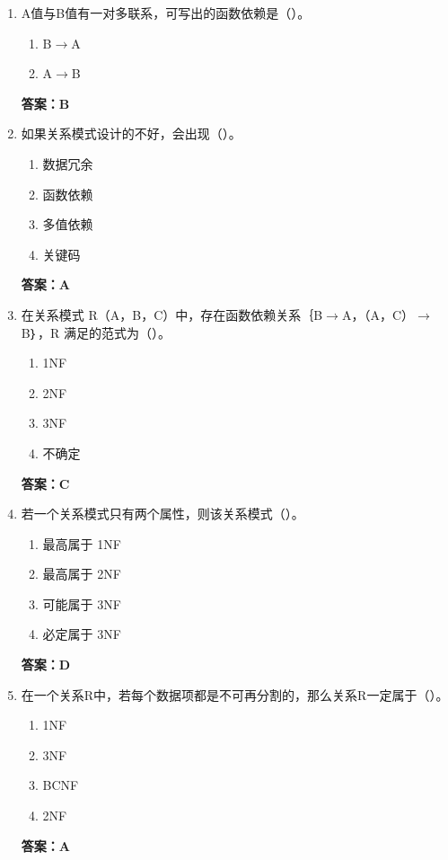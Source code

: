 \documentclass[12pt, a4paper]{article}
\begin{document}
\begin{enumerate}[label=\arabic*.]
	\item A值与B值有一对多联系，可写出的函数依赖是（\quad）。
	      \begin{enumerate}
		      \item B$\to$A
		      \item A$\to$B
	      \end{enumerate}
	      \textbf{答案：B}

	\item 如果关系模式设计的不好，会出现（\quad）。
	      \begin{enumerate}
		      \item 数据冗余
		      \item 函数依赖
		      \item 多值依赖
		      \item 关键码
	      \end{enumerate}
	      \textbf{答案：A}

	\item 在关系模式 R（A，B，C）中，存在函数依赖关系｛B$\to$A，（A，C）$\to$B｝，R 满足的范式为（\quad）。
	      \begin{enumerate}
		      \item 1NF
		      \item 2NF
		      \item 3NF
		      \item 不确定
	      \end{enumerate}
	      \textbf{答案：C}

	\item 若一个关系模式只有两个属性，则该关系模式（\quad）。
	      \begin{enumerate}
		      \item 最高属于 1NF
		      \item 最高属于 2NF
		      \item 可能属于 3NF
		      \item 必定属于 3NF
	      \end{enumerate}
	      \textbf{答案：D}

	\item 在一个关系R中，若每个数据项都是不可再分割的，那么关系R一定属于（\quad）。
	      \begin{enumerate}
		      \item 1NF
		      \item 3NF
		      \item BCNF
		      \item 2NF
	      \end{enumerate}
	      \textbf{答案：A}


\end{enumerate}
\end{document}
